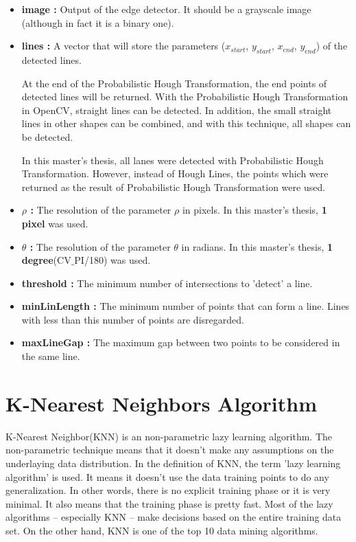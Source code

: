 \begin{itemize}

\item \textbf{image : }Output of the edge detector. It should be a grayscale image (although in fact it is a binary one).
 
\item \textbf{lines : }A vector that will store the parameters ($ x_{start} $, $ y_{start} $, $ x_{end} $, $ y_{end} $) of the detected lines.

At the end of the Probabilistic Hough Transformation, the end points of detected lines will be returned. With the Probabilistic Hough Transformation in OpenCV, straight lines can be detected. In addition, the small straight lines in other shapes can be combined, and with this technique, all shapes can be detected.  

In this master's thesis, all lanes were detected with Probabilistic Hough Transformation. However, instead of Hough Lines, the points which were returned as the result of Probabilistic Hough Transformation were used.

\item \textbf{$ \rho $ : }The resolution of the parameter $ \rho $ in pixels. In this master's thesis, \textbf{1 pixel} was used.

\item \textbf{$ \theta $ : }The resolution of the parameter $ \theta $ in radians. In this master's thesis, \textbf{1 degree}(CV$ \_ $PI/180) was used.

\item \textbf{threshold : }The minimum number of intersections to 'detect' a line.

\item \textbf{minLinLength : }The minimum number of points that can form a line. Lines with less than this number of points are disregarded.

\item \textbf{maxLineGap : }The maximum gap between two points to be considered in the same line.

\end{itemize}



%
\section{K-Nearest Neighbors Algorithm}\label{sec:K-Nearest Neighbors Algorithm}
%
K-Nearest Neighbor(KNN) is an non-parametric lazy learning algorithm. The non-parametric technique means that it doesn't make any assumptions on the underlaying data distribution. In the definition of KNN, the term 'lazy learning algorithm' is used. It means it doesn't use the data training points to do any generalization. In other words, there is no explicit training phase or it is very minimal.  It also means that the training phase is pretty fast. Most of the lazy algorithms -- especially KNN -- make decisions based on the entire training data set. On the other hand, KNN is one of the top 10 data mining algorithms\cite{k_nearest_neighbors}.

